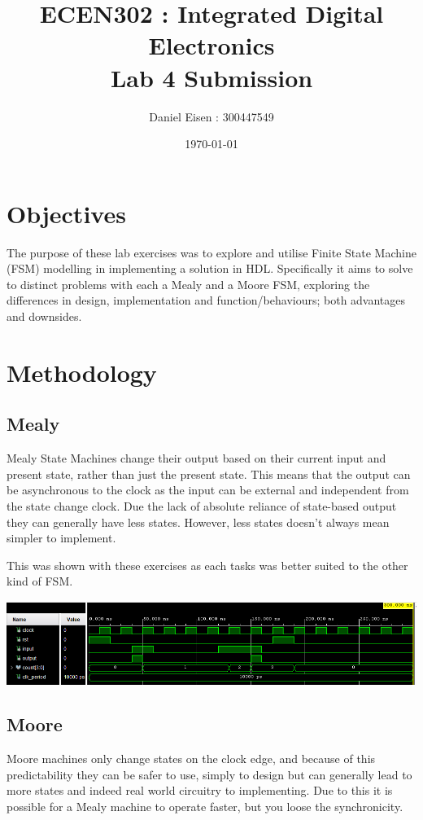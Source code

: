 \documentclass[11pt]{article}
\title{ECEN302 : Integrated Digital Electronics \\ Lab 4 Submission}
\author{Daniel Eisen : 300447549}
\date{\today}
\begin{document}
\begin{preview}
\maketitle
\section{Objectives}
The purpose of these lab exercises was to explore and utilise Finite State Machine (FSM) modelling in implementing a solution in HDL. Specifically it aims to solve to distinct problems with each a Mealy and a Moore FSM, exploring the differences in design, implementation and function/behaviours; both advantages and downsides.

\section{Methodology}
  \subsection{Mealy}
  Mealy State Machines change their output based on their current input and present state, rather than just the present state. This means that the output can be asynchronous to the clock as the input can be external and independent from the state change clock. Due the lack of absolute reliance of state-based output they can generally have less states. However, less states doesn't always mean simpler to implement. 

  This was shown with these exercises as each tasks was better suited to the other kind of FSM. 

  
  \includegraphics[width=\textwidth]{inc/mealy}
  \subsection{Moore}
  Moore machines only change states on the clock edge, and because of this predictability they can be safer to use, simply to design but can generally lead to more states and indeed real world circuitry to implementing. Due to this it is possible for a Mealy machine to operate faster, but you loose the synchronicity.  


\end{preview}
\end{document}
